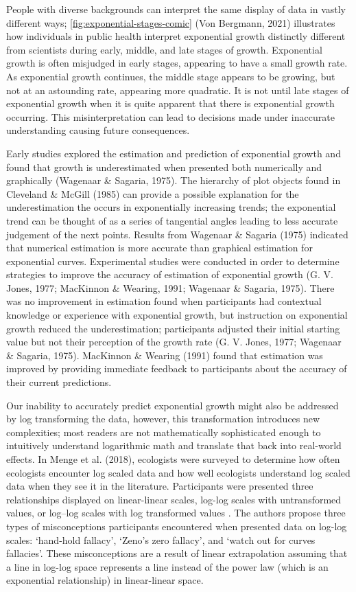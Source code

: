 \documentclass[print]{nuthesis}
\begin{document}
People with diverse backgrounds can interpret the same display of data in vastly different ways; \cref{fig:exponential-stages-comic} (Von Bergmann, 2021) illustrates how individuals in public health interpret exponential growth distinctly different from scientists during early, middle, and late stages of growth.
Exponential growth is often misjudged in early stages, appearing to have a small growth rate.
As exponential growth continues, the middle stage appears to be growing, but not at an astounding rate, appearing more quadratic.
It is not until late stages of exponential growth when it is quite apparent that there is exponential growth occurring.
This misinterpretation can lead to decisions made under inaccurate understanding causing future consequences.

Early studies explored the estimation and prediction of exponential growth and found that growth is underestimated when presented both numerically and graphically (Wagenaar \& Sagaria, 1975).
The hierarchy of plot objects found in Cleveland \& McGill (1985) can provide a possible explanation for the underestimation the occurs in exponentially increasing trends; the exponential trend can be thought of as a series of tangential angles leading to less accurate judgement of the next points.
Results from Wagenaar \& Sagaria (1975) indicated that numerical estimation is more accurate than graphical estimation for exponential curves.
Experimental studies were conducted in order to determine strategies to improve the accuracy of estimation of exponential growth (G. V. Jones, 1977; MacKinnon \& Wearing, 1991; Wagenaar \& Sagaria, 1975).
There was no improvement in estimation found when participants had contextual knowledge or experience with exponential growth, but instruction on exponential growth reduced the underestimation; participants adjusted their initial starting value but not their perception of the growth rate (G. V. Jones, 1977; Wagenaar \& Sagaria, 1975).
MacKinnon \& Wearing (1991) found that estimation was improved by providing immediate feedback to participants about the accuracy of their current predictions.

Our inability to accurately predict exponential growth might also be addressed by log transforming the data, however, this transformation introduces new complexities; most readers are not mathematically sophisticated enough to intuitively understand logarithmic math and translate that back into real-world effects.
In Menge et al. (2018), ecologists were surveyed to determine how often ecologists encounter log scaled data and how well ecologists understand log scaled data when they see it in the literature.
Participants were presented three relationships displayed on linear-linear scales, log-log scales with untransformed values, or log--log scales with log transformed values .
The authors propose three types of misconceptions participants encountered when presented data on log-log scales: `hand-hold fallacy', `Zeno's zero fallacy', and `watch out for curves fallacies'.
These misconceptions are a result of linear extrapolation assuming that a line in log-log space represents a line instead of the power law (which is an exponential relationship) in linear-linear space.
\end{document}
